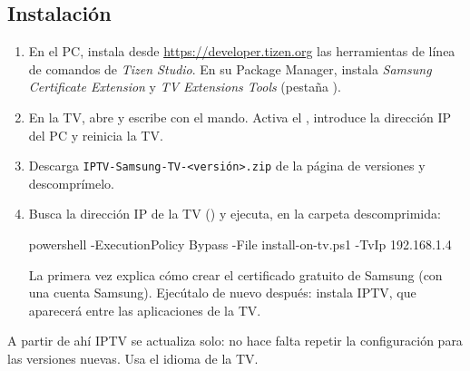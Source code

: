 \subsection{Instalación}
\begin{enumerate}
  \item En el PC, instala desde \url{https://developer.tizen.org} las
        herramientas de línea de comandos de \emph{Tizen Studio}. En su
        Package Manager, instala \emph{Samsung Certificate Extension} y
        \emph{TV Extensions Tools} (pestaña ).
  \item En la TV, abre  y escribe
         con el mando. Activa el
        , introduce la dirección IP del PC y reinicia
        la TV.
  \item Descarga \texttt{IPTV-Samsung-TV-\textless versión\textgreater.zip}
        de la página de versiones y descomprímelo.
  \item Busca la dirección IP de la TV () y
        ejecuta, en la carpeta descomprimida:
\begin{center}
\begin{minipage}{0.92\linewidth}
\small\ttfamily powershell -ExecutionPolicy Bypass -File install-on-tv.ps1 -TvIp 192.168.1.4
\end{minipage}
\end{center}
        La primera vez explica cómo crear el certificado gratuito de Samsung
        (con una cuenta Samsung). Ejecútalo de nuevo después: instala IPTV,
        que aparecerá entre las aplicaciones de la TV.
\end{enumerate}
A partir de ahí IPTV se actualiza solo: no hace falta repetir la
configuración para las versiones nuevas. Usa el idioma de la TV.

